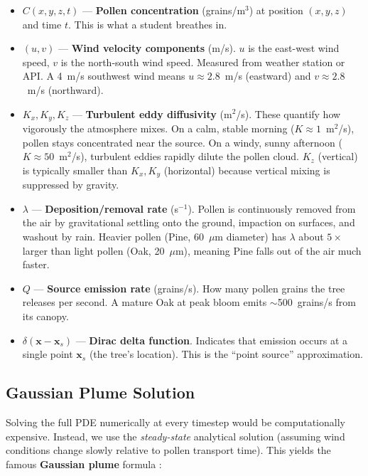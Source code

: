 \documentclass[11pt]{article}
\begin{document}
\begin{itemize}
    \item $C(x, y, z, t)$ --- \textbf{Pollen concentration} (grains/m$^3$) at position $(x,y,z)$ and time $t$. This is what a student breathes in.
    
    \item $(u, v)$ --- \textbf{Wind velocity components} (m/s). $u$ is the east-west wind speed, $v$ is the north-south wind speed. Measured from weather station or API. A 4~m/s southwest wind means $u \approx 2.8$~m/s (eastward) and $v \approx 2.8$~m/s (northward).
    
    \item $K_x, K_y, K_z$ --- \textbf{Turbulent eddy diffusivity} (m$^2$/s). These quantify how vigorously the atmosphere mixes. On a calm, stable morning ($K \approx 1$~m$^2$/s), pollen stays concentrated near the source. On a windy, sunny afternoon ($K \approx 50$~m$^2$/s), turbulent eddies rapidly dilute the pollen cloud. $K_z$ (vertical) is typically smaller than $K_x, K_y$ (horizontal) because vertical mixing is suppressed by gravity.
    
    \item $\lambda$ --- \textbf{Deposition/removal rate} (s$^{-1}$). Pollen is continuously removed from the air by gravitational settling onto the ground, impaction on surfaces, and washout by rain. Heavier pollen (Pine, 60~$\mu$m diameter) has $\lambda$ about $5\times$ larger than light pollen (Oak, 20~$\mu$m), meaning Pine falls out of the air much faster.
    
    \item $Q$ --- \textbf{Source emission rate} (grains/s). How many pollen grains the tree releases per second. A mature Oak at peak bloom emits $\sim$500~grains/s from its canopy.
    
    \item $\delta(\mathbf{x} - \mathbf{x}_s)$ --- \textbf{Dirac delta function}. Indicates that emission occurs at a single point $\mathbf{x}_s$ (the tree's location). This is the ``point source'' approximation.
\end{itemize}

\subsection{Gaussian Plume Solution}

Solving the full PDE numerically at every timestep would be computationally expensive. Instead, we use the \emph{steady-state} analytical solution (assuming wind conditions change slowly relative to pollen transport time). This yields the famous \textbf{Gaussian plume} formula \citep{pasquill1961}:
\end{document}
